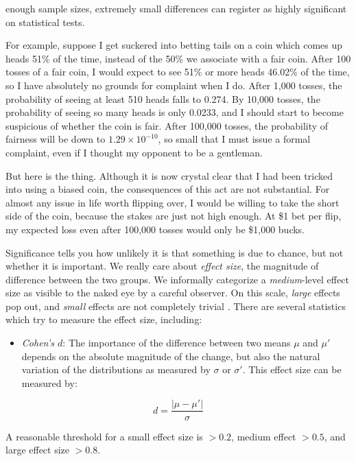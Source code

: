 \documentclass[10pt]{article}
\begin{document}
enough sample sizes, extremely small differences can register as highly significant on statistical tests.

For example, suppose I get suckered into betting tails on a coin which comes up heads 51\% of the time, instead of the 50\% we associate with a fair coin. After 100 tosses of a fair coin, I would expect to see 51\% or more heads 46.02\% of the time, so I have absolutely no grounds for complaint when I do. After 1,000 tosses, the probability of seeing at least 510 heads falls to 0.274. By 10,000 tosses, the probability of seeing so many heads is only 0.0233, and I should start to become suspicious of whether the coin is fair. After 100,000 tosses, the probability of fairness will be down to $1.29 \times 10^{-10}$, so small that I must issue a formal complaint, even if I thought my opponent to be a gentleman.

But here is the thing. Although it is now crystal clear that I had been tricked into using a biased coin, the consequences of this act are not substantial. For almost any issue in life worth flipping over, I would be willing to take the short side of the coin, because the stakes are just not high enough. At \$1 bet per flip, my expected loss even after 100,000 tosses would only be \$1,000 bucks.

Significance tells you how unlikely it is that something is due to chance, but not whether it is important. We really care about \textit{effect size}, the magnitude of difference between the two groups. We informally categorize a \textit{medium}-level effect size as visible to the naked eye by a careful observer. On this scale, \textit{large} effects pop out, and \textit{small} effects are not completely trivial \cite{SF12}. There are several statistics which try to measure the effect size, including:

\begin{itemize}
    \item \textit{Cohen's $d$}: The importance of the difference between two means $\mu$ and $\mu'$ depends on the absolute magnitude of the change, but also the natural variation of the distributions as measured by $\sigma$ or $\sigma'$. This effect size can be measured by:
\end{itemize}

\[
    d = \frac{|\mu - \mu'|}{\sigma}
\]

A reasonable threshold for a small effect size is $>0.2$, medium effect $>0.5$, and large effect size $>0.8$.
\end{document}
